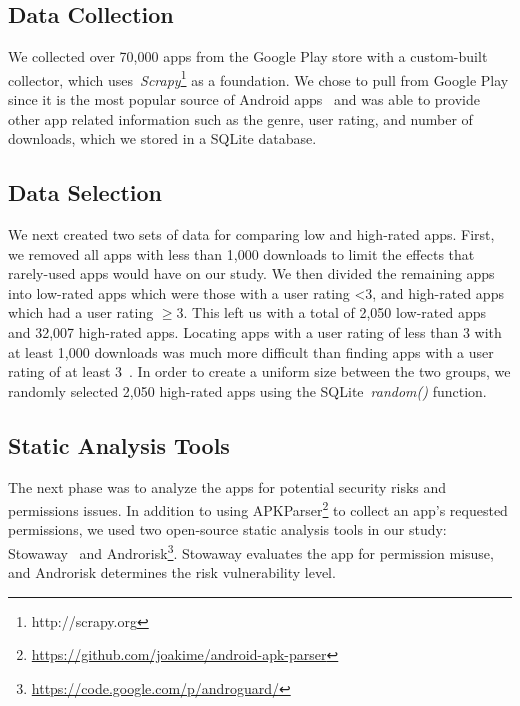\documentclass{sig-alternate-05-2015}
\newcommand{\todo}[1]{\textcolor{cyan}{\textbf{[#1]}}}
\begin{document}
\subsection{Data Collection}

We collected over 70,000 apps from the Google Play store with a custom-built collector, which uses~\emph{Scrapy}\footnote{http://scrapy.org} as a foundation. We chose to pull from Google Play since it is the most popular source of Android apps~\cite{businessofapps_url} and was able to provide other app related information such as the genre, user rating, and number of downloads, which we stored in a SQLite database.


\subsection{Data Selection}

We next created two sets of data for comparing low and high-rated apps. First, we removed all apps with less than 1,000 downloads to limit the effects that rarely-used apps would have on our study. We then divided the remaining apps into low-rated apps which were those with a user rating <3, and high-rated apps which had a user rating $\geq$3. This left us with a total of 2,050 low-rated apps and 32,007 high-rated apps. Locating apps with a user rating of less than 3 with at least 1,000 downloads was much more difficult than finding apps with a user rating of at least 3~\cite{mojica2013large}. In order to create a uniform size between the two groups, we randomly selected 2,050 high-rated apps using the SQLite~\emph{random()} function.


\subsection{Static Analysis Tools}
\label{sec: analysis}

The next phase was to analyze the apps for potential security risks and permissions issues. In addition to using APKParser\footnote{\url{https://github.com/joakime/android-apk-parser}} to collect an app's requested permissions, we used two open-source static analysis tools in our study: Stowaway~\cite{Felt:2011:APD:2046707.2046779} and Androrisk\footnote{\url{https://code.google.com/p/androguard/}}. Stowaway evaluates the app for permission misuse, and Androrisk determines the risk vulnerability level.
\end{document}
